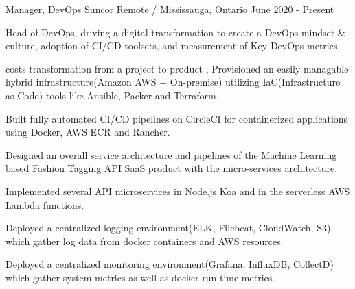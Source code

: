 

\begin{cventries}

  \cventry
    {Manager, DevOps} %
    {Suncor} %
    {Remote / Mississauga, Ontario} %
    {June 2020 - Present} %
    {
      \begin{cvitems} %
        \item {Head of DevOps, driving a digital transformation to create a DevOps mindset \& culture, adoption of CI/CD toolsets, and measurement of Key DevOps metrics}
        \item {costs transformation from a project to product , Provisioned an easily managable hybrid infrastructure(Amazon AWS + On-premise) utilizing IaC(Infrastructure as Code) tools like Ansible, Packer and Terraform.}
        \item {Built fully automated CI/CD pipelines on CircleCI for containerized applications using Docker, AWS ECR and Rancher.}
        \item {Designed an overall service architecture and pipelines of the Machine Learning based Fashion Tagging API SaaS product with the micro-services architecture.}
        \item {Implemented several API microservices in Node.js Koa and in the serverless AWS Lambda functions.}
        \item {Deployed a centralized logging environment(ELK, Filebeat, CloudWatch, S3) which gather log data from docker containers and AWS resources.}
        \item {Deployed a centralized monitoring environment(Grafana, InfluxDB, CollectD) which gather system metrics as well as docker run-time metrics.}
      \end{cvitems}
    }


\end{cventries}

